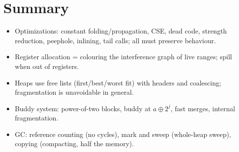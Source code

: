 \section{Summary}
\begin{itemize}
  \item Optimizations: constant folding/propagation, CSE, dead code, strength reduction,
        peephole, inlining, tail calls; all must preserve behaviour.
  \item Register allocation = colouring the interference graph of live ranges; spill when out of registers.
  \item Heaps use free lists (first/best/worst fit) with headers and coalescing; fragmentation is unavoidable in general.
  \item Buddy system: power-of-two blocks, buddy at $a \oplus 2^j$, fast merges, internal fragmentation.
  \item GC: reference counting (no cycles), mark and sweep (whole-heap sweep), copying
        (compacting, half the memory).
\end{itemize}
